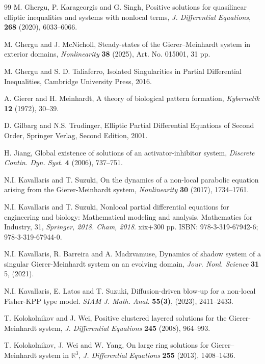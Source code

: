 \documentclass[leqno,12pt]{article}
\newcommand{\R}{\mathbb R}
\numberwithin{equation}{section}
\begin{document}
\begin{thebibliography}{99}
 M. Ghergu, P. Karageorgis and G. Singh, Positive solutions for quasilinear elliptic inequalities and systems with nonlocal terms, {\it J. Differential Equations}, \textbf{268} (2020), 6033--6066.

 M. Ghergu and J. McNicholl, Steady-states of the Gierer–Meinhardt system in exterior domains,
{\it Nonlinearity} {\bf 38} (2025), Art. No. 015001, 31 pp.

  M. Ghergu and S. D. Taliaferro, Isolated Singularities in Partial Differential Inequalities, Cambridge University Press, 2016.

  A. Gierer and H. Meinhardt, A theory of biological pattern formation,
{\it Kybernetik} {\bf 12} (1972), 30--39.

 D. Gilbarg and N.S. Trudinger, Elliptic Partial Differential Equations of Second Order, Springer Verlag, Second Edition, 2001. 

 H. Jiang, Global existence of solutions of an activator-inhibitor system,
{\it Discrete Contin. Dyn. Syst.} {\bf 4} (2006), 737--751.

 N.I. Kavallaris and T. Suzuki, On the dynamics of a non-local parabolic equation arising from the Gierer-Meinhardt system,
{\it Nonlinearity} {\bf 30} (2017), 1734--1761.

   N.I. Kavallaris and T. Suzuki,  Nonlocal partial differential equations for engineering and biology: Mathematical modeling and analysis. Mathematics for Industry, 31, 
{\it Springer, 2018. Cham, 2018}. xix+300 pp. ISBN: 978-3-319-67942-6; 978-3-319-67944-0.

  N.I. Kavallaris,  R. Barreira  and A. Madzvamuse,  Dynamics of shadow system of a singular Gierer-Meinhardt system on an evolving domain, 
{\it Jour. Nonl. Science} {\bf 31} 5, (2021). 

 N.I. Kavallaris, E. Latos and T. Suzuki, Diffusion-driven blow-up for a non-local Fisher-KPP type model.
{\it SIAM J. Math. Anal.} {\bf 55(3)}, (2023), 2411--2433. 

 T. Kolokolnikov and  J. Wei, Positive clustered layered solutions for the Gierer-Meinhardt system,
{\it J. Differential Equations} {\bf  245} (2008), 964--993.


 T. Kolokolnikov, J. Wei and W. Yang,   On large ring solutions for Gierer–Meinhardt system in $\R^3$,
{\it J. Differential Equations} {\bf  255} (2013), 1408--1436.


\end{thebibliography}
\end{document}
